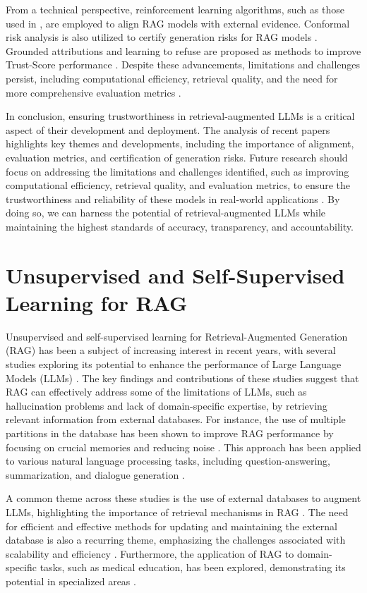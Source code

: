 \documentclass[conference]{IEEEtran}
\begin{document}
From a technical perspective, reinforcement learning algorithms, such as those used in \cite{b13}, are employed to align RAG models with external evidence. Conformal risk analysis is also utilized to certify generation risks for RAG models \cite{b14}. Grounded attributions and learning to refuse are proposed as methods to improve Trust-Score performance \cite{b15}. Despite these advancements, limitations and challenges persist, including computational efficiency, retrieval quality, and the need for more comprehensive evaluation metrics \cite{b16}.

In conclusion, ensuring trustworthiness in retrieval-augmented LLMs is a critical aspect of their development and deployment. The analysis of recent papers highlights key themes and developments, including the importance of alignment, evaluation metrics, and certification of generation risks. Future research should focus on addressing the limitations and challenges identified, such as improving computational efficiency, retrieval quality, and evaluation metrics, to ensure the trustworthiness and reliability of these models in real-world applications \cite{b17}. By doing so, we can harness the potential of retrieval-augmented LLMs while maintaining the highest standards of accuracy, transparency, and accountability.

\section{Unsupervised and Self-Supervised Learning for RAG}
Unsupervised and self-supervised learning for Retrieval-Augmented Generation (RAG) has been a subject of increasing interest in recent years, with several studies exploring its potential to enhance the performance of Large Language Models (LLMs) \cite{b1, b2, b3, b4}. The key findings and contributions of these studies suggest that RAG can effectively address some of the limitations of LLMs, such as hallucination problems and lack of domain-specific expertise, by retrieving relevant information from external databases. For instance, the use of multiple partitions in the database has been shown to improve RAG performance by focusing on crucial memories and reducing noise \cite{b5}. This approach has been applied to various natural language processing tasks, including question-answering, summarization, and dialogue generation \cite{b1, b2, b3, b4}.

A common theme across these studies is the use of external databases to augment LLMs, highlighting the importance of retrieval mechanisms in RAG \cite{b1, b2, b3, b4}. The need for efficient and effective methods for updating and maintaining the external database is also a recurring theme, emphasizing the challenges associated with scalability and efficiency \cite{b1, b2, b3, b4}. Furthermore, the application of RAG to domain-specific tasks, such as medical education, has been explored, demonstrating its potential in specialized areas \cite{b2}.
\end{document}
